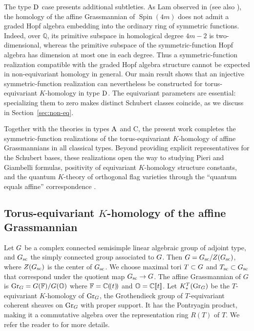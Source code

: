 \documentclass[a4paper]{amsart}
\theoremstyle{remark}
\numberwithin{equation}{section}
\begin{document}
The type $\mathrm{D}_{}$ case presents additional subtleties.
As Lam observed in \cite[Remark 1] {Lam2} (see also \cite[Conjecture 2.8]{Pon}), the homology of the
affine Grassmannian of $\operatorname{Spin}(4m)$ does not
admit a graded Hopf algebra embedding into the ordinary
ring of symmetric functions.
Indeed, over $\mathbb{Q}$, its primitive subspace in
homological degree $4m-2$ is two-dimensional, whereas
the primitive subspace of the symmetric-function Hopf
algebra has dimension at most one in each degree.
Thus a symmetric-function realization compatible with
the graded Hopf algebra structure cannot be expected
in non-equivariant homology in general.
Our main result shows that an injective symmetric-function
realization can nevertheless be constructed for
torus-equivariant $K$-homology in type $\mathrm{D}_{}$.
The equivariant parameters are essential: specializing
them to zero makes distinct Schubert classes coincide,
as we discuss in Section~\ref{sec:non-eq}.

Together with the theories in types $\mathrm{A}_{}$ and $\mathrm{C}$, the present work completes the symmetric-function realizations of the torus-equivariant $K$-homology of affine Grassmannians in all classical types. Beyond providing explicit representatives for the Schubert bases, these realizations open the way to studying Pieri and Giambelli formulas, positivity of equivariant \(K\)-homology structure constants, and the quantum \(K\)-theory of orthogonal flag varieties through the ``quantum equals affine'' correspondence \cite{Kato}.

\subsection{Torus-equivariant $K$-homology of the affine Grassmannian}
Let $G$ be a complex connected semisimple linear algebraic group
of adjoint type, and $G_{\mathrm{sc}}$ the simply connected 
group associated to $G$. Then $G=G_{\mathrm{sc}}/Z(G_{\mathrm{sc}})$, where 
$Z(G_{\mathrm{sc}})$ is the center of $G_{\mathrm{sc}}$.  We choose maximal tori
$T\subset G$ and $T_{\mathrm{sc}}\subset G_{\mathrm{sc}}$ that correspond under the quotient map \(G_{\mathrm{sc}}\to G\).
The affine Grassmannian of $G$ is $\mathrm{Gr}_G = G(\mathbb{F})/G(\mathbb{O})$ where $\mathbb{F}={\mathbb{C}}(\!(t)\!)$ and $\mathbb{O}=\mathbb{C}[\![t]\!]$.
Let $K^T_*(\mathrm{Gr}_G)$ be the $T$-equivariant $K$-homology of $\mathrm{Gr}_G$, the Grothendieck group of $T$-equivariant coherent sheaves on $\mathrm{Gr}_G$ with proper support.
It has the Pontryagin product, making it a commutative algebra over the representation ring $R(T)$ of $T$. We refer the reader to \cite{LSS:K,ISY} for more details. 
\end{document}
